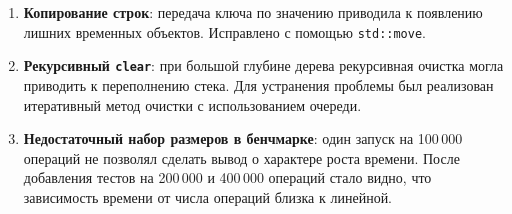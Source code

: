 \begin{enumerate}
    \item \textbf{Копирование строк}: передача ключа по значению приводила к появлению лишних временных
    объектов. Исправлено с помощью \texttt{std::move}.
    \item \textbf{Рекурсивный \texttt{clear}}: при большой глубине дерева рекурсивная очистка могла
    приводить к переполнению стека. Для устранения проблемы был реализован итеративный метод очистки
    с использованием очереди.
    \item \textbf{Недостаточный набор размеров в бенчмарке}: один запуск на 100\,000 операций не позволял
    сделать вывод о характере роста времени. После добавления тестов на 200\,000 и 400\,000 операций
    стало видно, что зависимость времени от числа операций близка к линейной.
\end{enumerate}

\pagebreak
